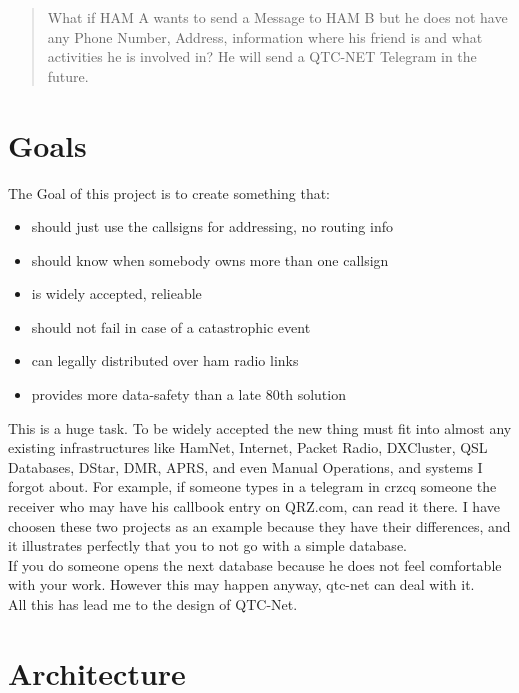 


\begin{abstract}
What if HAM A wants to send a Message to HAM B but he does not have any 
Phone Number, Address, information where his friend is and what activities 
he is involved in? He will send a QTC-NET Telegram in the future. 
\end{abstract}

\section{Goals}

The Goal of this project is to create something that:

\begin{itemize}
	\item should just use the callsigns for addressing, no routing info 
	\item should know when somebody owns more than one callsign
	\item is widely accepted, relieable
	\item should not fail in case of a catastrophic event
	\item can legally distributed over ham radio links
	\item provides more data-safety than a late 80th solution
\end{itemize}

This is a huge task. To be widely accepted the new thing must fit into almost 
any existing infrastructures like HamNet, Internet, Packet Radio, DXCluster, 
QSL Databases, DStar, DMR, APRS, and even Manual Operations, and systems I 
forgot about. For example, if someone types in a telegram in crzcq someone 
the receiver who may have his callbook entry on QRZ.com, can read it there. 
I have choosen these two projects as an example because they have their 
differences, and it illustrates perfectly that you to not go with a simple 
database. \\

If you do someone opens the next database because he does not feel 
comfortable with your work. However this may happen anyway, qtc-net can deal 
with it. \\

All this has lead me to the design of QTC-Net.  

\section{Architecture}

